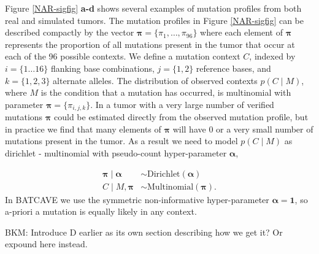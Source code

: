 \documentclass[a4,center,fleqn]{NAR}
\newcommand{\bkmcomment}[1]{{\color{blue}BKM: #1}}
\newcommand{\batcave}{BATCAVE }
\begin{document}
Figure \ref{NAR-sigfig} \textbf{a-d} shows several examples of mutation profiles from both real and simulated tumors.
The mutation profiles in Figure \ref{NAR-sigfig} can be described compactly by the vector $\boldsymbol{\pi} = \{\pi_1,\dots,\pi_{96}\}$ where each element of $\boldsymbol{\pi}$ represents the proportion of all mutations present in the tumor that occur at each of the 96 possible contexts.
We define a mutation context $C$, indexed by $i=\{1 \dots 16\}$ flanking base combinations, $j = \{1,2\}$ reference bases, and $k = \{1,2,3\}$ alternate alleles. 
The distribution of observed contexts $ p(C \mid M) $, where $M$ is the condition that a mutation has occurred, is multinomial with parameter $ \boldsymbol{ \pi } = \{\pi_{i,j,k}\} $.
In a tumor with a very large number of verified mutations $\boldsymbol{\pi}$ could be estimated directly from the observed mutation profile, but in practice we find that many elements of $\boldsymbol{\pi}$ will have $0$ or a very small number of mutations present in the tumor.
As a result we need to model $p(C \mid M)$ as dirichlet - multinomial with pseudo-count hyper-parameter $\boldsymbol{\alpha}$, 

$$
\begin{aligned}
  \boldsymbol{\pi} \mid \boldsymbol{\alpha} &\sim \textrm{Dirichlet}(\boldsymbol{\alpha}) \\
  C \mid M,\boldsymbol{\pi} & \sim \textrm{Multinomial}(\boldsymbol{\pi}).
\end{aligned}
$$
In \batcave we use the symmetric non-informative hyper-parameter $\boldsymbol{\alpha} = \boldsymbol{1}$, so a-priori a mutation is equally likely in any context.

\bkmcomment{Introduce D earlier as its own section describing how we get it? Or expound here instead.}
\end{document}
